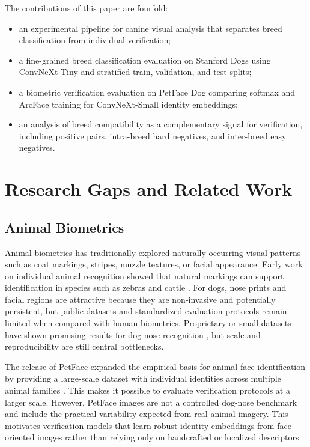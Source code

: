 \documentclass[conference]{IEEEtran}
\begin{document}
The contributions of this paper are fourfold:
\begin{itemize}
    \item an experimental pipeline for canine visual analysis that separates breed classification from individual verification;
    \item a fine-grained breed classification evaluation on Stanford Dogs using ConvNeXt-Tiny and stratified train, validation, and test splits;
    \item a biometric verification evaluation on PetFace Dog comparing softmax and ArcFace training for ConvNeXt-Small identity embeddings;
    \item an analysis of breed compatibility as a complementary signal for verification, including positive pairs, intra-breed hard negatives, and inter-breed easy negatives.
\end{itemize}

\section{Research Gaps and Related Work}

\subsection{Animal Biometrics}

Animal biometrics has traditionally explored naturally occurring visual patterns such as coat markings, stripes, muzzle textures, or facial appearance. Early work on individual animal recognition showed that natural markings can support identification in species such as zebras and cattle \cite{petersen1972zebra,andrew2017friesian}. For dogs, nose prints and facial regions are attractive because they are non-invasive and potentially persistent, but public datasets and standardized evaluation protocols remain limited when compared with human biometrics. Proprietary or small datasets have shown promising results for dog nose recognition \cite{kim2020dognose,zheng2020animal}, but scale and reproducibility are still central bottlenecks.

The release of PetFace expanded the empirical basis for animal face identification by providing a large-scale dataset with individual identities across multiple animal families \cite{shinoda2024petface}. This makes it possible to evaluate verification protocols at a larger scale. However, PetFace images are not a controlled dog-nose benchmark and include the practical variability expected from real animal imagery. This motivates verification models that learn robust identity embeddings from face-oriented images rather than relying only on handcrafted or localized descriptors.
\end{document}

